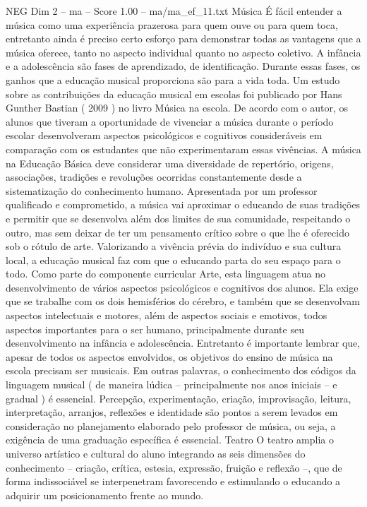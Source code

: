 \begin{textsample}{NEG Dim 2 – ma – Score 1.00 – ma/ma\_ef\_11.txt}  \label{ex:f2_neg_238}
Música É fácil entender a música como uma experiência prazerosa para quem ouve ou para quem toca, entretanto ainda é preciso certo esforço para demonstrar todas as vantagens que a música oferece, tanto no aspecto individual quanto no aspecto coletivo.
A infância e a adolescência são fases de aprendizado, de identificação.
Durante essas fases, os ganhos que a educação musical proporciona são para a vida toda.
Um estudo sobre as contribuições da educação musical em escolas foi publicado por Hans Gunther Bastian ( 2009 ) no livro Música na escola.
De acordo com o autor, os alunos que tiveram a oportunidade de vivenciar a música durante o período escolar desenvolveram aspectos psicológicos e cognitivos consideráveis em comparação com os estudantes que não experimentaram essas vivências.
A música na Educação Básica deve considerar uma diversidade de repertório, origens, associações, tradições e revoluções ocorridas constantemente desde a sistematização do conhecimento humano.
Apresentada por um professor qualificado e comprometido, a música vai aproximar o educando de suas tradições e permitir que se desenvolva além dos limites de sua comunidade, respeitando o outro, mas sem deixar de ter um pensamento crítico sobre o que lhe é oferecido sob o rótulo de arte.
Valorizando a vivência prévia do indivíduo e sua cultura local, a educação musical faz com que o educando parta do seu espaço para o todo.
Como parte do componente curricular Arte, esta linguagem atua no desenvolvimento de vários aspectos psicológicos e cognitivos dos alunos.
Ela exige que se trabalhe com os dois hemisférios do cérebro, e também que se desenvolvam aspectos intelectuais e motores, além de aspectos sociais e emotivos, todos aspectos importantes para o ser humano, principalmente durante seu desenvolvimento na infância e adolescência.
Entretanto é importante lembrar que, apesar de todos os aspectos envolvidos, os objetivos do ensino de música na escola precisam ser musicais.
Em outras palavras, o conhecimento dos códigos da linguagem musical ( de maneira lúdica – principalmente nos anos iniciais – e gradual ) é essencial.
Percepção, experimentação, criação, improvisação, leitura, interpretação, arranjos, reflexões e identidade são pontos a serem levados em consideração no planejamento elaborado pelo professor de música, ou seja, a exigência de uma graduação específica é essencial.
Teatro O teatro amplia o universo artístico e cultural do aluno integrando as seis dimensões do conhecimento – criação, crítica, estesia, expressão, fruição e reflexão –, que de forma indissociável se interpenetram favorecendo e estimulando o educando a adquirir um posicionamento frente ao mundo.

\end{textsample}
